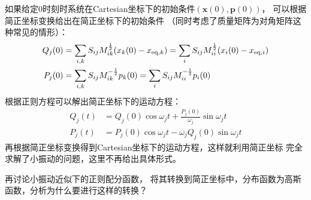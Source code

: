     \splitline

    如果给定0时刻时系统在Cartesian坐标下的初始条件$(\bm{x}(0),\bm{p}(0))$，
    可以根据简正坐标变换给出在简正坐标下的初始条件
    （同时考虑了质量矩阵为对角矩阵这种常见的情形）：
    \begin{equation}
        \begin{aligned}
            Q_j(0) &=\sum_{i,k} S_{ij} M^{\frac{1}{2}}_{ik}(x_k(0) - x_{\mathrm{eq},k}) =\sum_i S_{ij} M_{ii}^{\frac 12} (x_i(0) - x_{\mathrm{eq},i})\\
            P_j(0) &=\sum_{i,k} S_{ij} M^{-\frac{1}{2}}_{ik}p_k(0)=\sum_i S_{ij} M_{ii}^{-\frac 12} p_{i}(0)
        \end{aligned}
    \end{equation}
    根据正则方程可以解出简正坐标下的运动方程：
    \begin{equation}
        \begin{aligned}
            Q_j(t) &= Q_j(0)\cos{\omega_j t} + \frac{P_j(0)}{\omega_j} \sin{\omega_j t}\\
            P_j(t) &= P_j(0)\cos{\omega_j t} - \omega_j Q_j(0) \sin{\omega_j t}
        \end{aligned}
    \end{equation}
    再根据简正坐标变换得到Cartesian坐标下的运动方程，这样就利用简正坐标
    完全求解了小振动的问题，这里不再给出具体形式。

    \splitline

    再讨论小振动近似下的正则配分函数，
    将其转换到简正坐标中，分布函数为高斯函数，分析为什么要进行这样的转换？

